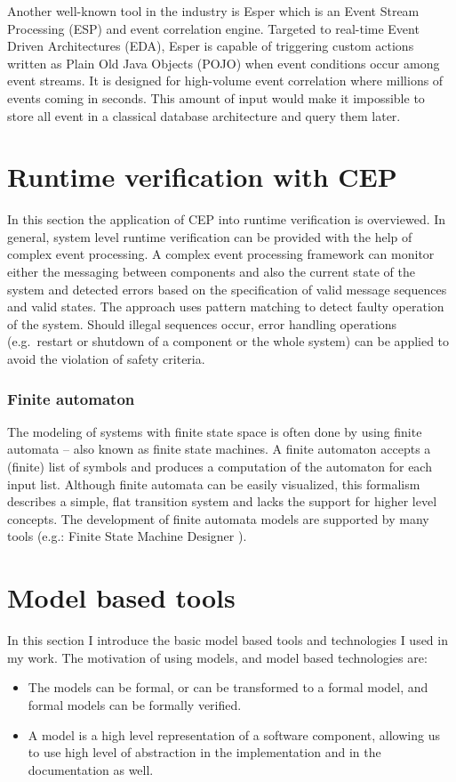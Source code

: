 Another well-known tool in the industry is Esper\citep{esper} which is an Event Stream Processing (ESP) and event correlation engine. %
Targeted to real-time Event Driven Architectures (EDA), Esper is capable of triggering custom actions written as Plain Old Java Objects (POJO) when event conditions occur among event streams. It is designed for high-volume event correlation where millions of events coming in seconds. This amount of input would make it impossible to store all event in a classical database architecture and query them later.

\section{Runtime verification with CEP}
In this section the application of CEP into runtime verification is overviewed.
In general, system level runtime verification can be provided with the help of complex event processing. A complex event processing framework can monitor either the messaging between components and also the current state of the system and detected errors based on the specification of valid message sequences and valid states. 
The approach uses pattern matching to detect faulty operation of the system. Should illegal sequences occur, error handling operations (e.g.~restart or shutdown of a component or the whole system) can be applied to avoid the violation of safety criteria.

\subsubsection{Finite automaton }


The modeling of systems with finite state space is often done by using finite automata -- also known as finite state machines. A finite automaton accepts a (finite) list of symbols and produces a computation of the automaton for each input list.
Although finite automata can be easily visualized, this formalism describes a simple, flat transition system and lacks the support for higher level concepts. The development of finite automata models are supported by many tools (e.g.: Finite State Machine Designer \citep{fsmd}).

\section{Model based tools}
In this section I introduce the basic model based tools and technologies I used in my work. The motivation of using models, and model based technologies are:
\begin{itemize}
	\item The models can be formal, or can be transformed to a formal model, and formal models can be formally verified.
	\item A model is a high level representation of a software component, allowing us to use high level of abstraction in the implementation and in the documentation as well.
\end{itemize}

